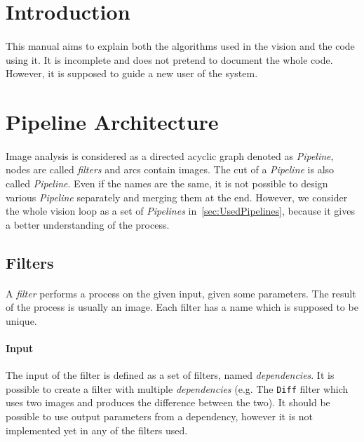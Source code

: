 \documentclass[a4paper,12pt]{article}
\begin{document}
\section{Introduction}

\paragraph{}
This manual aims to explain both the algorithms used in the vision and the code using it.
It is incomplete and does not pretend to document the whole code. However, it is
supposed to guide a new user of the system.

\section{Pipeline Architecture}
\paragraph{}
Image analysis is considered as a directed acyclic graph denoted as
\emph{Pipeline}, nodes are called \emph{filters} and arcs contain images.
The cut of a \emph{Pipeline} is also called \emph{Pipeline}. Even if the names
are the same, it is not possible to design various \emph{Pipeline} separately
and merging them at the end. However, we consider the whole vision loop as a set
of \emph{Pipelines} in~\ref{sec:UsedPipelines}, because it gives a better
understanding of the process.
 
\subsection{Filters}
\paragraph{}
A \emph{filter} performs a process on the given input, given some parameters.
The result of the process is usually an image. Each filter has a name which is
supposed to be unique.

\paragraph{Input}
The input of the filter is defined as a set of filters, named
\emph{dependencies}. It is possible to create a filter with multiple
\emph{dependencies} (e.g. The \verb!Diff! filter which uses two images and
produces the difference between the two). It should be possible to use
output parameters from a dependency, however it is not implemented yet in
any of the filters used.
\end{document}
